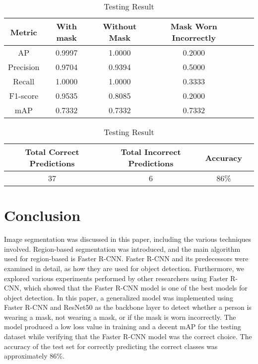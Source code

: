 \documentclass[conference]{IEEEtran}
\begin{document}
    \begin{table}[!htbp]
        \centering
        \caption{Testing Result}
            \begin{tabular}{|c|c|c|c|c|c|}
                \hline
                    \textbf{Metric} & \textbf{With mask} & \textbf{Without Mask} & \textbf{Mask Worn Incorrectly} \\
                \hline
                    AP & 0.9997 & 1.0000 & 0.2000\\
                \hline
                    Precision & 0.9704 & 0.9394 & 0.5000\\
                \hline
                    Recall & 1.0000 & 1.0000 & 0.3333\\
                \hline
                    F1-score & 0.9535 & 0.8085 & 0.2000\\
                \hline
                    mAP & 0.7332 & 0.7332 & 0.7332\\
                \hline
            \end{tabular}            
        \label{tab1}
    \end{table}

    \begin{table}[!htbp]
        \centering
        \caption{Testing Result}
            \begin{tabular}{|c|c|c|c|}
                \hline
                    \textbf{Total Correct Predictions} & \textbf{Total Incorrect Predictions} & \textbf{Accuracy} \\
                \hline
                    37 & 6 & 86\%\\
                \hline
            \end{tabular}            
        \label{tab1}
    \end{table}
    \FloatBarrier

\section{Conclusion}
Image segmentation was discussed in this paper, including the various techniques involved. Region-based segmentation was introduced, and the main algorithm used for 
region-based is Faster R-CNN.  Faster R-CNN and its predecessors were examined in detail, as how they are used for object detection. Furthermore, we explored various 
experiments performed by other researchers using Faster R-CNN, which showed that the Faster R-CNN model is one of the best models for object detection. In this paper, 
a generalized model was implemented using Faster R-CNN and ResNet50 as the backbone layer to detect whether a person is wearing a mask, not wearing a mask, or if the 
mask is worn incorrectly. The model produced a low loss value in training and a decent mAP for the testing dataset while verifying that the Faster R-CNN model was 
the correct choice. The accuracy of the test set for correctly predicting the correct classes was approximately 86\%. 
\end{document}
